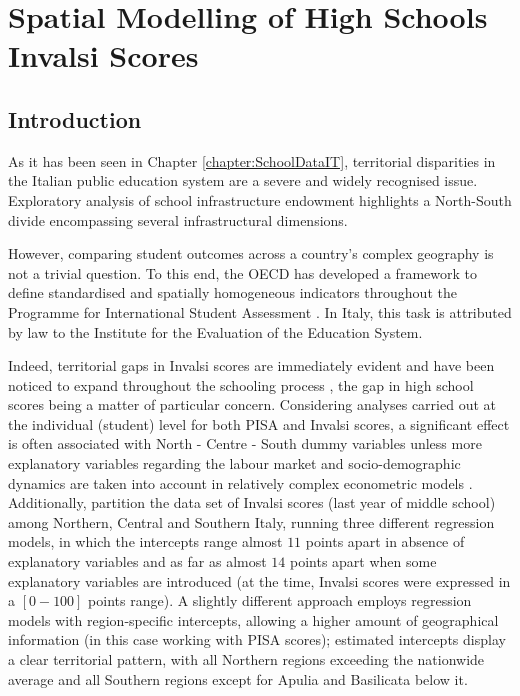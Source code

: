 \documentclass[openany, 11pt, oneside]{book}
\begin{document}
\chapter[Spatial analysis of Invalsi scores]{Spatial Modelling of High Schools Invalsi Scores} \label{Chapter:Invalsi}
\section{Introduction}

 As it has been seen in Chapter \ref{chapter:SchoolDataIT}, territorial disparities in the Italian public education system are a severe and widely recognised issue. Exploratory analysis of school infrastructure endowment highlights a North-South divide encompassing several infrastructural dimensions.
 
 However, comparing student outcomes across a country's complex geography is not a trivial question. To this end, the OECD has developed a framework to define standardised and spatially homogeneous indicators throughout the Programme for International Student Assessment \parencite[PISA,][]{PISA}. In Italy, this task is attributed by law \parencite{InvalsiLaw} to the Institute for the Evaluation of the Education System. 
 
 Indeed, territorial gaps in Invalsi scores are immediately evident and have been noticed to expand throughout the schooling process \parencite{Invalsi2020}, the gap in high school scores being a matter of particular concern.  Considering analyses carried out at the individual (student) level for both PISA and Invalsi scores, a significant effect is often associated with North - Centre - South dummy variables  \parencite[as in e.g. ][]{Giancola, Bratti, Agasisti, UniromaWP1} unless more explanatory variables regarding the labour market and socio-demographic dynamics are taken into account in relatively complex econometric models \parencite{Bratti}. Additionally, \cite{Agasisti} partition the data set of Invalsi scores (last year of middle school) among Northern, Central and Southern Italy, running three different regression models, in which the intercepts range almost $11$ points apart in absence of explanatory variables and as far as almost $14$ points apart when some explanatory variables are introduced (at the time, Invalsi scores were expressed in a $[0-100]$ points range). A slightly different approach employs regression models with region-specific intercepts, allowing a higher amount of geographical information \parencite{Matteucci} (in this case working with PISA scores); estimated intercepts display a clear territorial pattern, with all Northern regions exceeding the nationwide average and all Southern regions except for Apulia and Basilicata below it.
 
\end{document}
